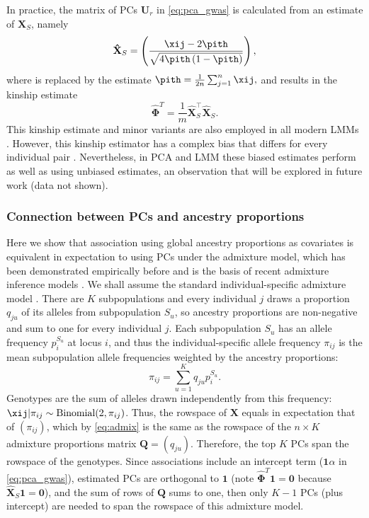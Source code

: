 \documentclass[11pt]{article}
\begin{document}
In practice, the matrix of PCs $\mathbf{U}_r$ in \cref{eq:pca_gwas} is calculated from an estimate of $\mathbf{X}_S$, namely
\begin{equation*}
  \mathbf{\hat{X}}_S
  =
  \left(
    \frac{
      \xij - 2 \pith
    }{
      \sqrt{4 \pith \left( 1 - \pith \right)}
    }
  \right)
  ,
\end{equation*}
where \pit is replaced by the estimate
$
\pith = \frac{1}{2n} \sum_{j = 1}^n \xij,
$
and results in the kinship estimate
\begin{equation}
  \label{eq:kinship_std}
  \mathbf{\hat{\Phi}}^T
  =
  \frac{1}{m}
  \mathbf{\hat{X}}_S^\intercal
  \mathbf{\hat{X}}_S
  .
\end{equation}
This kinship estimate and minor variants are also employed in all modern LMMs \citep{yang_gcta:_2011}.
However, this kinship estimator has a complex bias that differs for every individual pair \citep{ochoa_estimating_2021, ochoa_human}.
Nevertheless, in PCA and LMM these biased estimates perform as well as using unbiased estimates, an observation that will be explored in future work (data not shown).

\subsubsection{Connection between PCs and ancestry proportions}

Here we show that association using global ancestry proportions as covariates is equivalent in expectation to using PCs under the admixture model, which has been demonstrated empirically before \citep{alexander_fast_2009, zhou_strong_2016} and is the basis of recent admixture inference models \citep{zheng_eigenanalysis_2016,cabreros_likelihood-free_2019}.
We shall assume the standard individual-specific admixture model \citep{pritchard_inference_2000, alexander_fast_2009}.
There are $K$ subpopulations and every individual $j$ draws a proportion $q_{ju}$ of its alleles from subpopulation $S_u$, so ancestry proportions are non-negative and sum to one for every individual $j$.
Each subpopulation $S_u$ has an allele frequency $p_i^{S_u}$ at locus $i$, and thus the individual-specific allele frequency $\pi_{ij}$ is the mean subpopulation allele frequencies weighted by the ancestry proportions:
\begin{equation}
  \label{eq:admix}
  \pi_{ij} = \sum_{u=1}^K q_{ju} p_i^{S_u}.
\end{equation}
Genotypes are the sum of alleles drawn independently from this frequency: $\xij | \pi_{ij} \sim \text{Binomial}(2, \pi_{ij})$.
Thus, the rowspace of $\mathbf{X}$ equals in expectation that of $(\pi_{ij})$, which by \cref{eq:admix} is the same as the rowspace of the $n \times K$ admixture proportions matrix $\mathbf{Q} = (q_{ju})$.
Therefore, the top $K$ PCs span the rowspace of the genotypes.
Since associations include an intercept term ($\mathbf{1} \alpha$ in \cref{eq:pca_gwas}), estimated PCs are orthogonal to $\mathbf{1}$ (note $\mathbf{\hat{\Phi}}^T \mathbf{1} = \mathbf{0}$ because $\mathbf{\hat{X}}_S \mathbf{1} = \mathbf{0}$), and the sum of rows of $\mathbf{Q}$ sums to one, then only $K-1$ PCs (plus intercept) are needed to span the rowspace of this admixture model.
\end{document}
